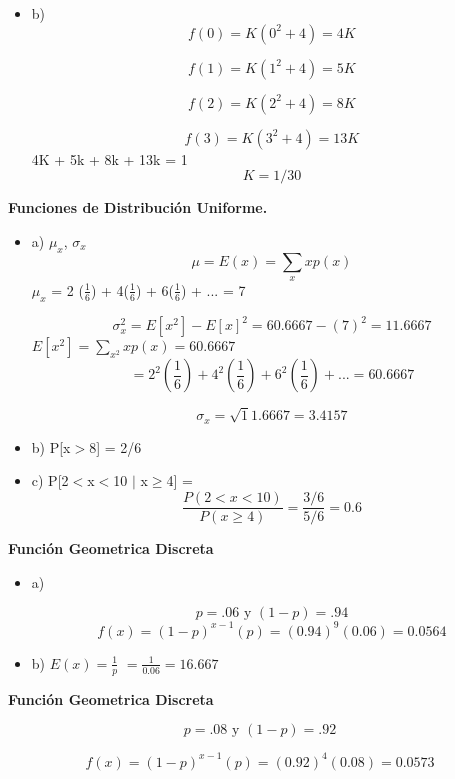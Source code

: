 \documentclass{../oxmathproblems}
\begin{document}
\begin{questions}
\begin{itemize}
\item  b) 
$$f(0) = K(0^2 + 4) =  4K $$

$$f(1) = K(1^2 + 4) =  5K $$

$$f(2) = K(2^2 + 4) =  8K $$

$$f(3) = K(3^2 + 4) =  13K $$
4K + 5k + 8k + 13k = 1
$$ K = 1/30 $$
\end{itemize}

\miquestion\textbf{Funciones de Distribución Uniforme. }
\begin{itemize}
\item  a) $\mu_x$, $\sigma_x$
$$ \mu = E(x)= \sum_x xp(x)$$ 
 $\mu_x$ = 2 ($\frac{1}{6} $) + 4($\frac{1}{6} $) + 6($\frac{1}{6} $) + ... = 7 

$$ \sigma_x^2 = E[x^2]-E[x]^2 = 60.6667 - (7)^2 = 11.6667 $$ 
 $ E[x^2] = \sum_{x^2} xp(x)  = 60.6667 $ 
 $$ = 2^2 (\frac{1}{6}) + 4^2(\frac{1}{6}) + 6^2(\frac{1}{6}) + ... =  60.6667 $$ 
 
 $$ \sigma_x  = \sqrt11.6667 = 3.4157 $$ 


\item  b) P[x$>$8] = 2/6

\item  c) P[2$<$x$<$10 $\mid$ x$\geq$4]
= $$  \frac{P(2 < x <10)}{P (x \geq 4)} = \frac{3/6}{5/6} = 0.6 $$ 
\end{itemize}

\miquestion\textbf { Función Geometrica Discreta}
\begin{itemize}
\item a)


$$ p = .06 \text{ y }
(1 - p )= .94 $$ 
$$ f(x) = (1-p)^{x-1} (p)  = (0.94)^9(0.06) = 0.0564 $$
\item b) 
$ E(x) = \frac{1}{p} $ 
$ = \frac{1}{0.06} = 16.667 $
\end{itemize}

\miquestion\textbf { Función Geometrica Discreta}

$$ p = .08 \text{ y }
(1 - p )= .92 $$ 

$$ f(x) = (1-p)^{x-1} (p)  = (0.92)^4(0.08) = 0.0573 $$

\end {questions}
\end{document}
